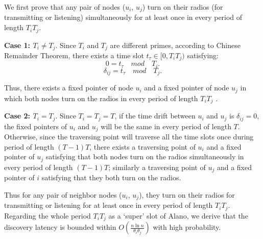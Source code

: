\begin{IEEEproof}
We first prove that any pair of nodes ($u_i$, $u_j$) turn on their radios (for transmitting or listening) simultaneously for at least once in every period of length $T_iT_j$.

\textbf{Case 1: $T_i \neq T_j$}. Since $T_i$ and $T_j$ are different primes,
according to Chinese Remainder Theorem\cite{ding1996chinese}, there exists a time slot $t_\tau \in \lbrack 0,T_iT_j ) $ satisfying:
\begin{equation}
\label{case1.1}
0 = t_\tau  \quad mod \quad  T_i.
\end{equation}
\begin{equation}
\label{case1.2}
\delta_{ij} = t_\tau  \quad mod \quad  T_j.
\end{equation}

Thus, there exists a fixed pointer of node $u_i$
and a fixed pointer of node $u_j$ in which both nodes turn on the radios in every period of length $T_iT_j$  .

\textbf{Case 2: $T_i = T_j$}. Since $T_i = T_j = T$, if the time drift between $u_i$ and $u_j$ is $\delta_{ij} = 0$, the fixed pointers of $u_i$ and $u_j$ will be the same in every period of length $T$.
Otherwise, since the traversing point will traverse all the time slots once during period of length $(T-1)T$,
there exists a traversing point of $u_i$ and a fixed pointer
of $u_j$ satisfying that both nodes turn on the radios simultaneously in every period of length $(T-1)T$; similarly a traversing point of $u_j$ and a fixed pointer of $i$ satisfying that they both turn on the radios.

Thus for any pair of neighbor nodes ($u_i$, $u_j$), they turn on their radios for transmitting or listening for at least once in every period of length $T_iT_j$. Regarding
the whole period $T_iT_j$ as a `super' slot of Alano, we derive that the discovery latency is bounded within $O(\frac{n\ln n}{\theta_i\theta_j})$ with high probability.
\end{IEEEproof}






